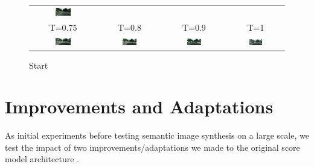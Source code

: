 \begin{figure}
\begin{tabular}{cccc}
        \includegraphics[width=0.25\textwidth]{Chapters/figures/experiments/seg_start/0_0.7_cond_sample.png}  \\
        T=0.75 & T=0.8 & T=0.9 & T=1  \\
        \includegraphics[width=0.25\textwidth]{Chapters/figures/experiments/seg_start/0_0.75_cond_sample.png} & 
        \includegraphics[width=0.25\textwidth]{Chapters/figures/experiments/seg_start/0_0.8_cond_sample.png} & 
        \includegraphics[width=0.25\textwidth]{Chapters/figures/experiments/seg_start/0_0.9_cond_sample.png} & 
        \includegraphics[width=0.25\textwidth]{Chapters/figures/experiments/seg_start/0_1.0_cond_sample.png}
    \end{tabular}
    \caption{Start}
\end{figure}
\section{Improvements and Adaptations}
As initial experiments before testing semantic image synthesis on a large scale, we test the impact of two improvements/adaptations we made to the original score model architecture \cite{score_3}.
